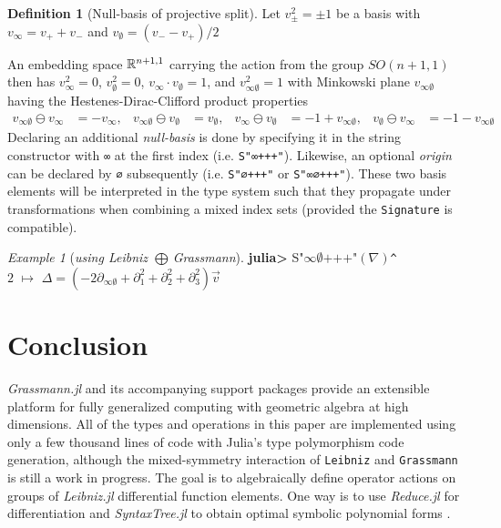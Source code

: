 \documentclass[]{article}
\theoremstyle{definition}
\newtheorem{definition}{Definition}
\theoremstyle{remark}
\newtheorem{example}{Example}
\begin{document}
\begin{definition}
	[Null-basis of projective split]
	Let $v_\pm^2 = \pm1$ be a basis with $v_\infty = v_++v_-$ and $v_\emptyset = (v_--v_+)/2$
\end{definition}
An embedding space $\mathbb{R}^{n+1,1}$ carrying the action from the group $SO(n+1,1)$ then has
$v_\infty^2 =0$, $v_\emptyset^2 =0$,
$v_\infty \cdot v_\emptyset = 1$,  and $v_{\infty\emptyset}^2 = 1$ with
Minkowski plane $v_{\infty\emptyset}$ having the Hestenes-Dirac-Clifford product properties
\begin{align*}
	v_{\infty\emptyset}\ominus v_\infty &= -v_\infty, &  v_{\infty\emptyset}\ominus v_\emptyset &= v_\emptyset, &
	v_\infty\ominus v_\emptyset &= -1 + v_{\infty\emptyset}, & v_\emptyset\ominus v_\infty &=  -1 - v_{\infty\emptyset}
\end{align*}
Declaring an additional \textit{null-basis} is done by specifying it in the string constructor with \verb`∞` at the first index (i.e. \verb`S"∞+++"`). Likewise, an optional \textit{origin} can be declared by \verb`∅` subsequently (i.e. \verb`S"∅+++"` or \verb`S"∞∅+++"`). These two basis elements will be interpreted in the type system such that they propagate under transformations when combining a mixed index sets (provided the \verb`Signature` is compatible).
\begin{example}[\textit{using Leibniz $\bigoplus\,$Grassmann}]
	\textbf{julia>} S"$\infty\emptyset\text{+++"}(\nabla)$\verb`^`$2 \,\,  \mapsto\, \, \Delta = (-2\partial_{\infty\emptyset} + \partial_1^2 + \partial_2^2 + \partial_3^2)\vec v $
\end{example}

\section{Conclusion}

\textit{Grassmann.jl} and its accompanying support packages provide an extensible platform for fully generalized computing with geometric algebra at high dimensions.
All of the types and operations in this paper are implemented using only a few thousand lines of code with Julia's type polymorphism code generation, although the mixed-symmetry interaction of \verb`Leibniz` and \verb`Grassmann` is still a work in progress.
The goal is to algebraically define operator actions on groups of \textit{Leibniz.jl} differential function elements. 
One way is to use \textit{Reduce.jl} for differentiation and \textit{SyntaxTree.jl} to obtain optimal symbolic polynomial forms \cite{optim-poly}.
\end{document}

